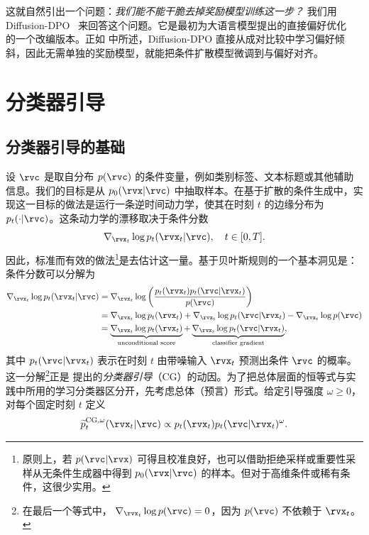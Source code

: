 这就自然引出一个问题：\emph{我们能不能干脆去掉奖励模型训练这一步？} 我们用 Diffusion-DPO~\citep{wallace2024diffusion} 来回答这个问题。它是最初为大语言模型提出的直接偏好优化~\citep{rafailov2023direct} 的一个改编版本。正如  中所述，Diffusion-DPO 直接从成对比较中学习偏好倾斜，因此无需单独的奖励模型，就能把条件扩散模型微调到与偏好对齐。


\section{分类器引导}\label{sec:cg}

\subsection{分类器引导的基础}
设 $\rvc$ 是取自分布 $p(\rvc)$ 的条件变量，例如类别标签、文本标题或其他辅助信息。我们的目标是从 $p_0(\rvx | \rvc)$ 中抽取样本。在基于扩散的条件生成中，实现这一目标的做法是运行一条逆时间动力学，使其在时刻 $t$ 的边缘分布为 $p_t(\cdot | \rvc)$。这条动力学的漂移取决于条件分数
\[
\nabla_{\rvx_t}\log p_t(\rvx_t | \rvc), \quad t \in [0,T].
\]
因此，标准而有效的做法\footnote{原则上，若 $p(\rvc | \rvx)$ 可得且校准良好，也可以借助拒绝采样或重要性采样从无条件生成器中得到 $p_0(\rvx | \rvc)$ 的样本。但对于高维条件或稀有条件，这很少实用。}是去估计这一量。基于贝叶斯规则的一个基本洞见是：条件分数可以分解为
\begin{align}
\nabla_{\rvx_t} \log p_t(\rvx_t | \rvc)
&= \nabla_{\rvx_t} \log \left( \frac{p_t(\rvx_t)   p_t(\rvc | \rvx_t)}{p(\rvc)} \right) \nonumber \\
&= \nabla_{\rvx_t} \log p_t(\rvx_t) + \nabla_{\rvx_t} \log p_t(\rvc | \rvx_t) - \nabla_{\rvx_t} \log p(\rvc) \nonumber \\
&= \underbrace{\nabla_{\rvx_t} \log p_t(\rvx_t)}_{\text{unconditional score}}
+ \underbrace{\nabla_{\rvx_t} \log p_t(\rvc | \rvx_t)}_{\text{classifier gradient}}, \label{eq:cg_bayes}
\end{align}
其中 $p_t(\rvc | \rvx_t)$ 表示在时刻 $t$ 由带噪输入 $\rvx_t$ 预测出条件 $\rvc$ 的概率。这一分解\footnote{在最后一个等式中，
$\nabla_{\rvx_t}\log p(\rvc)=0$，因为 $p(\rvc)$ 不依赖于
$\rvx_t$。}正是 \citet{dhariwal2021diffusion} 提出的\emph{分类器引导}（CG）的动因。为了把总体层面的恒等式与实践中所用的学习分类器区分开，先考虑总体（预言）形式。给定引导强度 $\omega\geq0$，对每个固定时刻 $t$ 定义
\begin{align}
\widetilde p_t^{\mathrm{CG},\omega}(\rvx_t|\rvc)
\propto
p_t(\rvx_t)p_t(\rvc|\rvx_t)^\omega.
\label{eq:cg-density-omega}
\end{align}

